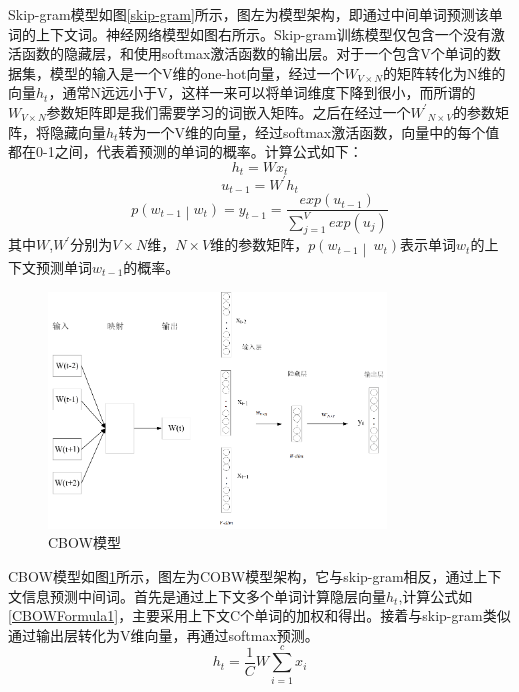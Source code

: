 Skip-gram模型如图\ref{skip-gram}所示，图左为模型架构，即通过中间单词预测该单词的上下文词。神经网络模型如图右所示。Skip-gram训练模型仅包含一个没有激活函数的隐藏层，和使用softmax激活函数的输出层。对于一个包含V个单词的数据集，模型的输入是一个V维的one-hot向量，经过一个$W_{V\times N}$的矩阵转化为N维的向量$h_t$，通常N远远小于V，这样一来可以将单词维度下降到很小，而所谓的$W_{V\times N}$参数矩阵即是我们需要学习的词嵌入矩阵。之后在经过一个${W^\prime}_{N\times V}$的参数矩阵，将隐藏向量$h_t$转为一个V维的向量，经过softmax激活函数，向量中的每个值都在0-1之间，代表着预测的单词的概率。计算公式如下：
\begin{equation}\label{skip-gramFormula1}
	h_t=Wx_t
\end{equation}
\begin{equation}\label{skip-gramFormula2}
	u_{t-1}=W^{\prime}h_t
\end{equation}
\begin{equation}\label{skip-gramFormula3}
	p\left(w_{t-1}\middle|w_t\right)=y_{t-1}=\frac{exp\left(u_{t-1}\right)}{\sum_{j=1}^{V}exp\left(u_j\right)}
\end{equation}
其中$W$,$W^\prime$分别为$V\times N$维，$N\times V$维的参数矩阵，$p\left(w_{t-1}\middle|\ w_t\right)$表示单词$w_t$的上下文预测单词$w_{t-1}$的概率。
\begin{figure}[htb]%
	\setlength{\belowcaptionskip}{0pt}
	\centering
	\includegraphics[width=0.8\textwidth]{pic/2-5.png}
	\caption{CBOW模型}
	\label{CBOW}
\end{figure}

CBOW模型如图\ref{CBOW}所示，图左为COBW模型架构，它与skip-gram相反，通过上下文信息预测中间词。首先是通过上下文多个单词计算隐层向量$h_t$,计算公式如\ref{CBOWFormula1}，主要采用上下文C个单词的加权和得出。接着与skip-gram类似通过输出层转化为V维向量，再通过softmax预测。
\begin{equation}\label{CBOWFormula1}
	h_t=\frac{1}{C}W\sum_{i=1}^{c}x_i
\end{equation}


